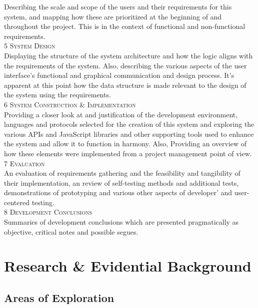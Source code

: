 \documentclass[11pt, english]{article}
\begin{document}
	Describing the scale and scope of the users and their requirements for this system, and mapping how these are prioritized at the beginning of and throughout the project. This is in the context of functional and non-functional requirements.\\

	\textsc{5 System Design}\\
	
	Displaying the structure of the system architecture and how the logic aligns with the requirements of the system. Also, describing the various aspects of the user interface's functional and graphical communication and design process. It's apparent at this point how the data structure is made relevant to the design of the system using the requirements.\\

	\textsc{6 System Construction \& Implementation}\\
	
	Providing a closer look at and justification of the development environment, languages and protocols selected for the creation of this system and exploring the various APIs and JavaScript libraries and other supporting tools used to enhance the system and allow it to function in harmony. Also, Providing an overview of how these elements were implemented from a project management point of view.\\

	\textsc{7 Evaluation}\\
	
	An evaluation of requirements gathering and the feasibility and tangibility of their implementation, an review of self-testing methods and additional tests, demonstrations of prototyping and various other aspects of developer' and user-centered testing.\\

	\textsc{8 Development Conclusions}\\

	Summaries of development conclusions which are presented pragmatically as objective, critical notes and possible segues.

\newpage

\section{Research \& Evidential Background}\label{ch2}

	\subsection{Areas of Exploration}
\end{document}
